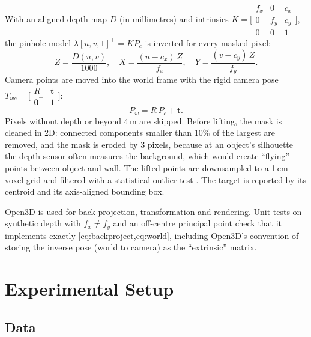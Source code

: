 \documentclass[conference,a4paper]{IEEEtran}
\begin{document}
With an aligned depth map $D$ (in millimetres) and intrinsics
$K = \bigl[\begin{smallmatrix} f_x & 0 & c_x\\ 0 & f_y & c_y \\ 0 & 0 & 1\end{smallmatrix}\bigr]$,
the pinhole model $\lambda[u,v,1]^\top = K P_c$ is inverted for every masked pixel:
\begin{equation}
Z = \frac{D(u,v)}{1000},\quad X = \frac{(u - c_x)\,Z}{f_x},\quad Y = \frac{(v - c_y)\,Z}{f_y}.
\label{eq:backproject}
\end{equation}
Camera points are moved into the world frame with the rigid camera pose
$T_{wc} = \bigl[\begin{smallmatrix} R & \mathbf{t} \\ \mathbf{0}^\top & 1\end{smallmatrix}\bigr]$:
\begin{equation}
P_w = R\,P_c + \mathbf{t}.
\label{eq:world}
\end{equation}
Pixels without depth or beyond 4\,m are skipped. Before lifting, the mask is cleaned in 2D: connected
components smaller than 10\% of the largest are removed, and the mask is eroded by 3 pixels, because
at an object's silhouette the depth sensor often measures the background, which would create
\enquote{flying} points between object and wall. The lifted points are downsampled to a 1\,cm voxel
grid and filtered with a statistical outlier test \cite{rusu2008objectmaps}. The target is reported
by its centroid and its axis-aligned bounding box.

Open3D \cite{zhou2018open3d} is used for back-projection, transformation and rendering. Unit tests on
synthetic depth with $f_x \neq f_y$ and an off-centre principal point check that it implements
exactly \cref{eq:backproject,eq:world}, including Open3D's convention of storing the inverse pose
(world to camera) as the \enquote{extrinsic} matrix.

\section{Experimental Setup}
\label{sec:setup}

\subsection{Data}
\end{document}
